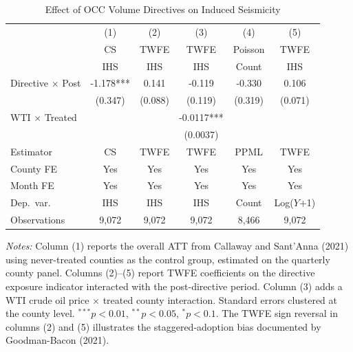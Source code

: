 \begin{table}[htbp]
\centering
\caption{Effect of OCC Volume Directives on Induced Seismicity}
\label{tab:main}
\begin{threeparttable}
\begin{tabular}{lccccc}
\toprule
 & (1) & (2) & (3) & (4) & (5) \\
 & CS & TWFE & TWFE & Poisson & TWFE \\
 & IHS & IHS & IHS & Count & IHS \\
\midrule
Directive $\times$ Post & -1.178*** & 0.141 & -0.119 & -0.330 & 0.106 \\
 & (0.347) & (0.088) & (0.119) & (0.319) & (0.071) \\
WTI $\times$ Treated & & & -0.0117*** & & \\
 & & & (0.0037) & & \\
\midrule
Estimator & CS & TWFE & TWFE & PPML & TWFE \\
County FE & Yes & Yes & Yes & Yes & Yes \\
Month FE & Yes & Yes & Yes & Yes & Yes \\
Dep.\ var.\ & IHS & IHS & IHS & Count & Log($Y$+1) \\
Observations & 9,072 & 9,072 & 9,072 & 8,466 & 9,072 \\
\bottomrule
\end{tabular}
\begin{tablenotes}[flushleft]
\small
\item \textit{Notes:} Column (1) reports the overall ATT from Callaway and Sant'Anna (2021) using never-treated counties as the control group, estimated on the quarterly county panel. Columns (2)--(5) report TWFE coefficients on the directive exposure indicator interacted with the post-directive period. Column (3) adds a WTI crude oil price $\times$ treated county interaction. Standard errors clustered at the county level. $^{***}p<0.01$, $^{**}p<0.05$, $^{*}p<0.1$. The TWFE sign reversal in columns (2) and (5) illustrates the staggered-adoption bias documented by Goodman-Bacon (2021).
\end{tablenotes}
\end{threeparttable}
\end{table}

